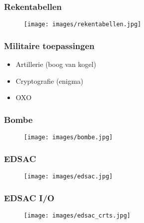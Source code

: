 \documentclass[aspectratio=43]{uva-inf-presentation}
\begin{document}

\begin{frame}
\frametitle{Rekentabellen}

\begin{figure}
\texttt{[image: images/rekentabellen.jpg]}
\end{figure}

\end{frame}


\begin{frame}
\frametitle{Militaire toepassingen}

\begin{itemize}
\item Artillerie (boog van kogel)
\item Cryptografie (enigma)
\item OXO
\end{itemize}

\end{frame}


\begin{frame}
\frametitle{Bombe}

\begin{figure}
\texttt{[image: images/bombe.jpg]}
\end{figure}

\end{frame}


\begin{frame}
\frametitle{EDSAC}

\begin{figure}
\texttt{[image: images/edsac.jpg]}
\end{figure}

\end{frame}


\begin{frame}
\frametitle{EDSAC I/O}

\begin{figure}
\texttt{[image: images/edsac\_crts.jpg]}
\end{figure}

\end{frame}
\end{document}
